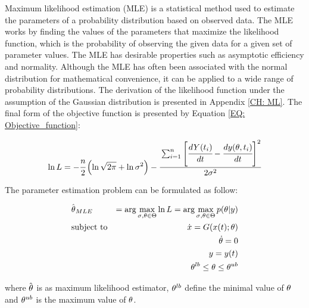\documentclass[../Article_Design_of_Experiment.tex]{subfiles}
\begin{document}
	Maximum likelihood estimation (MLE) is a statistical method used to estimate the parameters of a probability distribution based on observed data. The MLE works by finding the values of the parameters that maximize the likelihood function, which is the probability of observing the given data for a given set of parameter values. The MLE has desirable properties such as asymptotic efficiency and normality. Although the MLE has often been associated with the normal distribution for mathematical convenience, it can be applied to a wide range of probability distributions. The derivation of the likelihood function under the assumption of the Gaussian distribution is presented in Appendix \ref{CH: ML}. The final form of the objective function is presented by Equation \ref{EQ: Objective_function}:
	
	{\footnotesize
		\begin{equation} \label{EQ: Objective_function}
			\ln L = -\cfrac{n}{2} \left( \ln \sqrt{2 \pi} + \ln {\color{black} \sigma}^2 \right)
			- \cfrac{ \sum_{i=1}^{n} \left[  \cfrac{d {Y}(t_i)}{dt} - \cfrac{d{\color{black}y}({\color{black} \theta}, t_i)}{dt} \right]^2 }{2 {\color{black} \sigma}^2}
		\end{equation}
	}
	
	The parameter estimation problem can be formulated as follow:
	
	{\footnotesize
		\begin{equation}
			\begin{aligned} \label{EQ: Optimization_formulation_MLE}
				&\hat{{\color{black} \theta}}_{MLE} &= \arg \max_{{\color{black} \sigma}, {\color{black} \theta} \in \Theta} \ln L = \arg \max_{{\color{black} \sigma},{\color{black} \theta} \in \Theta} p({\color{black} \theta}|{\color{black}y}) \\
				&\text{subject to}
				& \dot{ {\color{black}x} } = {\color{black}G}({\color{black} x}(t);{\color{black} \theta}) \\
				&& {\color{black} \dot{\theta}} = 0 \\
				&& {\color{black}y} = {\color{black}y}(t) \\
				&& {\color{black} \theta}^{lb} \leq {\color{black} \theta} \leq {\color{black} \theta}^{ub}
			\end{aligned}
	\end{equation} } 
	
	where $\hat{{\color{black} \theta}}$ is as maximum likelihood estimator, ${\color{black} \theta}^{lb}$ define the minimal value of ${\color{black} \theta}$ and ${\color{black} \theta}^{ub}$ is the maximum value of ${\color{black} \theta}$.
	
\end{document}
